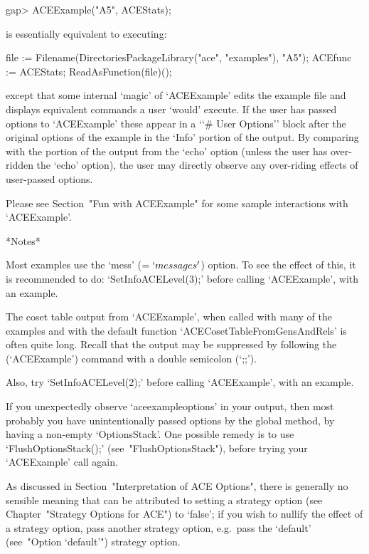 \beginexample
gap> ACEExample("A5", ACEStats);
\endexample

is essentially equivalent to executing:

\beginexample
file := Filename(DirectoriesPackageLibrary("ace", "examples"), "A5");
ACEfunc := ACEStats;
ReadAsFunction(file)();
\endexample

except that  some  internal  \lq{}magic'  of  `ACEExample'  edits  the
example file and  displays  equivalent  commands  a  user  \lq{}would'
execute. If the user has passed options to `ACEExample'  these  appear
in a \lq{}`\# User Options'' block after the original options  of  the
example in the `Info' portion of the output.  By  comparing  with  the
portion of the output from the `echo'  option  (unless  the  user  has
over-ridden the `echo' option), the  user  may  directly  observe  any
over-riding effects of user-passed options.

Please see Section~"Fun with ACEExample" for some sample  interactions
with `ACEExample'.

*Notes*

Most examples use the `mess'  ($=  `messages'$)  option.  To  see  the
effect of this, it is recommended to do: `SetInfoACELevel(3);'  before
calling `ACEExample', with an example.

The coset table output from `ACEExample', when called with many of the
examples     and     with     the     default     {\ACE}      function
`ACECosetTableFromGensAndRels' is often quite long.  Recall  that  the
output may be suppressed by following the (`ACEExample') command  with
a double semicolon (`;;').

Also, try `SetInfoACELevel(2);' before  calling `ACEExample', with  an
example.

If you unexpectedly observe `aceexampleoptions' in your  output,  then
most probably you have unintentionally passed options  by  the  global
method, by having a non-empty `OptionsStack'. One possible  remedy  is
to use `FlushOptionsStack();' (see~"FlushOptionsStack"), before trying
your `ACEExample' call again.

As discussed in Section~"Interpretation  of  ACE  Options",  there  is
generally no sensible meaning that can  be  attributed  to  setting  a
strategy option (see Chapter~"Strategy Options for ACE")  to  `false';
if you wish to nullify the effect of a strategy option,  pass  another
strategy option,  e.g.~pass  the  `default'  (see~"Option  `default'")
strategy option.

\enditems

